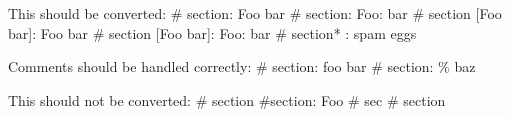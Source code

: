 This should be converted:
# section: Foo bar
# section: Foo: bar
# section [Foo bar]: Foo bar
# section [Foo\: bar]: Foo: bar
# section* : spam eggs

Comments should be handled correctly:
# section: foo bar %
# section: \% baz %

This should not be converted:
# section
#section: Foo
# sec%
# section %
